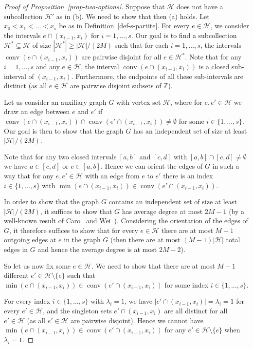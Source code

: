 \documentclass[10pt,a4paper]{amsart}
\theoremstyle{definition}
\newcommand{\su}{\subseteq}
\newcommand{\sm}{\setminus}
\newcommand{\Z}{\mathbb{Z}}
\newcommand{\HH}{\mathcal{H}}
\newcommand{\conv}{\operatorname{conv}}
\begin{document}
\begin{proof}[Proof of Proposition~\ref{prop-two-options}]
Suppose that $\HH$ does not have a subcollection $\HH'$ as in (b). We need to show that then (a) holds. Let $x_0<x_1<\dots<x_s$ be as in Definition~\ref{def-s-partite}. For every $e\in \HH$, we consider the intervals $e\cap (x_{i-1},x_i)$ for $i=1,\dots,s$. Our goal is to find a subcollection $\HH^*\su \HH$ of size $|\HH^*|\ge |\HH|/(2M)$ such that for each $i=1,\dots,s$, the intervals $\conv(e\cap (x_{i-1},x_i))$ are pairwise disjoint for all $e\in \HH^*$. Note that for any $i=1,\dots,s$ and any $e\in \HH$, the interval $\conv(e\cap (x_{i-1},x_i))$ is a closed sub-interval of $(x_{i-1},x_i)$. Furthermore, the endpoints of all these sub-intervals are distinct (as all $e\in \HH$ are pairwise disjoint subsets of $\Z$).

Let us consider an auxiliary graph $G$ with vertex set $\HH$, where for $e,e'\in\HH$ we draw an edge between $e$ and $e'$ if $\conv(e\cap (x_{i-1},x_i))\cap \conv(e'\cap (x_{i-1},x_i))\ne \emptyset$ for some $i\in\{1,\dots,s\}$. Our goal is then to show that the graph $G$ has an independent set of size at least $|\HH|/(2M)$.

Note that for any two closed intervals $[a,b]$ and $[c,d]$ with $[a,b]\cap [c,d]\ne \emptyset$ we have $a\in [c,d]$ or $c\in [a,b]$. Hence we can orient the edges of $G$ in such a way that for any $e,e'\in\HH$ with an edge from $e$ to $e'$ there is an index $i\in\{1,\dots,s\}$ with $\min(e\cap (x_{i-1},x_i))\in \conv(e'\cap (x_{i-1},x_i))$.

In order to show that the graph $G$ contains an independent set of size at least $|\HH|/(2M)$, it suffices to show that $G$ has average degree at most $2M-1$ (by a well-known result of Caro~\cite{Caro} and Wei~\cite{Wei}). Considering the orientation of the edges of $G$, it therefore suffices to show that for every $e\in \HH$ there are at most $M-1$ outgoing edges at $e$ in the graph $G$ (then there are at most $(M-1)|\HH|$ total edges in $G$ and hence the average degree is at most $2M-2$).

So let us now fix some $e\in \HH$. We need to show that there are at most $M-1$ different $e'\in\HH\sm\{e\}$ such that $\min(e\cap (x_{i-1},x_i))\in \conv(e'\cap (x_{i-1},x_i))$ for some index $i\in\{1,\dots,s\}$. 

For every index $i\in\{1,\dots,s\}$ with $\lambda_i=1$, we have $|e'\cap (x_{i-1},x_i)|=\lambda_i=1$ for every $e'\in \HH$, and the singleton sets $e'\cap (x_{i-1},x_i)$ are all distinct for all $e'\in \HH$ (as all $e'\in \HH$ are pairwise disjoint). Hence we cannot have $\min(e\cap (x_{i-1},x_i))\in \conv(e'\cap (x_{i-1},x_i))$ for any $e'\in \HH\sm\{e\}$ when $\lambda_i=1$.


\end{proof}
\end{document}
